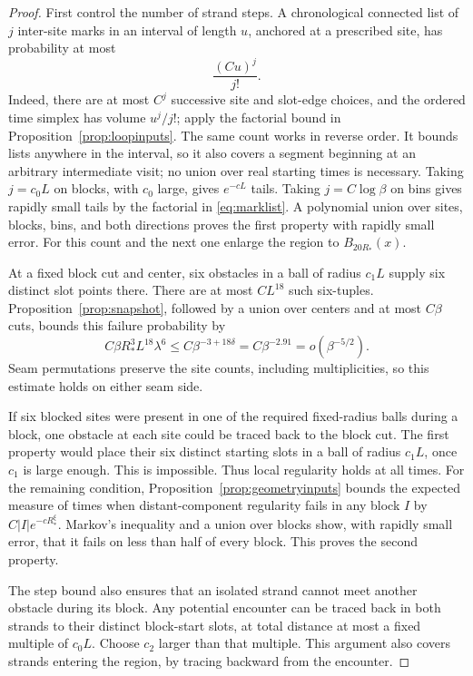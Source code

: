 \begin{proof}
First control the number of strand steps.  A chronological connected
list of $j$ inter-site marks in an interval of length $u$, anchored at
a prescribed site, has probability at most
\begin{equation}\label{eq:marklist}
 \frac{(Cu)^j}{j!}.
\end{equation}
Indeed, there are at most $C^j$ successive site and slot-edge choices,
and the ordered time simplex has volume $u^j/j!$; apply the factorial
bound in Proposition~\ref{prop:loopinputs}.  The same count works in
reverse order.  It bounds lists anywhere in the interval, so it also
covers a segment beginning at an arbitrary intermediate visit; no
union over real starting times is necessary.  Taking $j=c_0L$ on
blocks, with $c_0$ large, gives $e^{-cL}$ tails.  Taking
$j=C\log\beta$ on bins gives rapidly small tails by the factorial in
\eqref{eq:marklist}.  A polynomial union over sites, blocks, bins, and
both directions proves the first property with rapidly small error.
For this count and the next one enlarge the region to $B_{20R_*}(x)$.

At a fixed block cut and center, six obstacles in a ball of radius
$c_1L$ supply six distinct slot points there.  There are at most
$CL^{18}$ such six-tuples.  Proposition~\ref{prop:snapshot}, followed
by a union over centers and at most $C\beta$ cuts, bounds this failure
probability by
\begin{equation}\label{eq:sixfailure}
 C\beta R_*^3L^{18}\lambda^6
       \le C\beta^{-3+18\delta}
       =C\beta^{-2.91}=o(\beta^{-5/2}).
\end{equation}
Seam permutations preserve the site counts, including multiplicities,
so this estimate holds on either seam side.

If six blocked sites were present in one of the required fixed-radius
balls during a block, one obstacle at each site could be traced back
to the block cut.  The first property would place their six distinct
starting slots in a ball of radius $c_1L$, once $c_1$ is large enough.
This is impossible.  Thus local regularity holds at all times.
For the remaining condition, Proposition~\ref{prop:geometryinputs}
bounds the expected measure of times when distant-component regularity
fails in any block $I$ by $C|I|e^{-cR_*^\xi}$.  Markov's inequality
and a union over blocks show, with rapidly small error, that it fails
on less than half of every block.  This proves the second property.

The step bound also ensures that an isolated strand cannot meet another
obstacle during its block.  Any potential encounter can be traced back
in both strands to their distinct block-start slots, at total distance
at most a fixed multiple of $c_0L$.  Choose $c_2$ larger than that
multiple.  This argument also covers strands entering the region,
by tracing backward from the encounter.


\end{proof}
